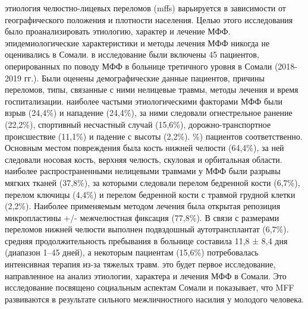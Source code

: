 этиология челюстно-лицевых переломов (mffs) варьируется в зависимости от
географического положения и плотности населения. Целью этого исследования было
проанализировать этиологию, характер и лечение МФФ. эпидемиологические
характеристики и методы лечения МФФ никогда не оценивались в Сомали. в
исследование были включены 45 пациентов, оперированных по поводу МФФ в больнице
третичного уровня в Сомали (2018-2019 гг.). Были оценены демографические данные
пациентов, причины переломов, типы, связанные с ними нелицевые травмы, методы
лечения и время госпитализации. наиболее частыми этиологическими факторами МФФ
были взрыв (24,4\%) и нападение (24,4\%), за ними следовали огнестрельное
ранение (22,2\%), спортивный несчастный случай (15,6\%), дорожно-транспортное
происшествие (11,1\%) и падение с высоты (2,2\%). \%) пациентов соответственно.
Основным местом повреждения была кость нижней челюсти (64,4\%), за ней следовали
носовая кость, верхняя челюсть, скуловая и орбитальная области. наиболее
распространенными нелицевыми травмами у МФФ были разрывы мягких тканей (37,8\%),
за которыми следовали перелом бедренной кости (6,7\%), перелом ключицы (4,4\%) и
перелом бедренной кости с травмой грудной клетки (2,2\%). Наиболее применяемым
методом лечения была открытая репозиция микропластины +/- межчелюстная фиксация
(77,8\%). В связи с размерами переломов нижней челюсти выполнен подвздошный
аутотрансплантат (6,7\%). средняя продолжительность пребывания в больнице
составила 11,8 ± 8,4 дня (диапазон 1–45 дней), а некоторым пациентам (15,6\%)
потребовалась интенсивная терапия из-за тяжелых травм. это будет первое
исследование, направленное на анализ этиологии, характера и лечения МФФ в
Сомали. Это исследование посвящено социальным аспектам Сомали и показывает, что
MFF развиваются в результате сильного межличностного насилия у молодого
человека.\cite{34351730}

